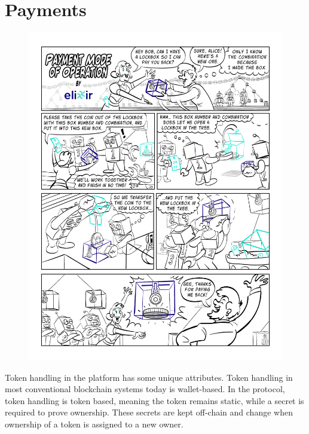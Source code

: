 \section{Payments}
\label{section:payments}

\begin{figure}[H]
    \centering
    \includegraphics[width=\textwidth]{cartoons/PaymentOperation.pdf}
\end{figure}

\break

Token handling in the \name platform has some unique attributes. Token handling in most conventional blockchain systems today is wallet-based. In the \name protocol, token handling is token based, meaning the token remains static, while a secret is required to prove ownership. These secrets are kept off-chain and change when ownership of a token is assigned to a new owner. 

